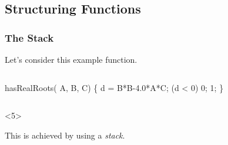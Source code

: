 \documentclass[smaller,handout,table]{beamer}
\begin{document}
\subsection{Structuring Functions}
\begin{frame}[fragile]
\frametitle{The Stack}
Let's consider this example function.
\begin{columns}
\begin{column}{5cm}
\begin{semiverbatim}
 hasRealRoots(\alert<2>{ A},
       \alert<2>{ B,  C})
\{
   \alert<3>{ d} = B*B-4.0*A*C;
    (d < 0) \alert<4>{} 0;
   \alert<4>{} 1;
\}
\end{semiverbatim}
\end{column}
\begin{column}{5cm}
\end{column}
\end{columns}
\vspace{0.1in}
\begin{block}<5>{}
\begin{center}
\alert<5>{This is achieved by using a \emph{stack}.}
\end{center}
\end{block}
\end{frame}
\end{document}
